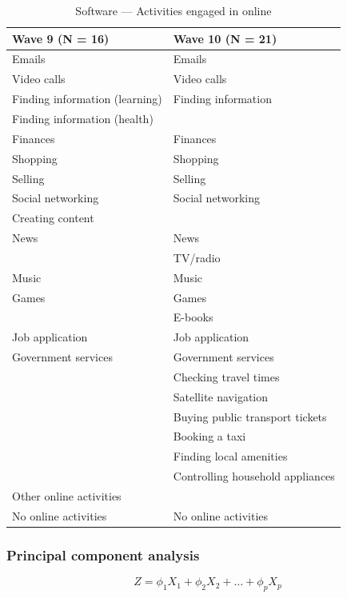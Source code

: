 \begin{table}[h!]
    \centering
    \caption{Software --- Activities engaged in online}
    \label{tab:software}
    \begin{tabular}{ll}
        \toprule
        Wave 9 (N = 16) & Wave 10 (N = 21) \\
        \midrule
        Emails & Emails \\
        Video calls & Video calls \\
        Finding information (learning) & Finding information \\
        Finding information (health) & \\
        Finances & Finances \\
        Shopping & Shopping \\
        Selling & Selling \\
        Social networking & Social networking \\
        Creating content & \\
        News & News \\
         & TV/radio \\
        Music & Music \\
        Games & Games \\
         & E-books \\
        Job application & Job application \\
        Government services & Government services \\
         & Checking travel times \\
         & Satellite navigation \\
         & Buying public transport tickets \\
         & Booking a taxi \\
         & Finding local amenities \\
         & Controlling household appliances \\
        Other online activities & \\
        No online activities & No online activities \\
        \bottomrule
    \end{tabular}
\end{table}

\subsubsection{Principal component analysis}


\begin{equation}
    \label{eq:pca_loadings}
    Z = \phi_{1}X_1 + \phi_{2}X_2 + \ldots + \phi_{p}X_p
\end{equation}


